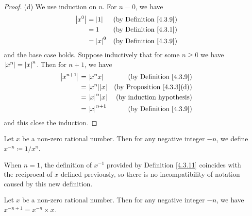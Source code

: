 \begin{proof}{(d)}
    We use induction on \(n\).
    For \(n = 0\), we have
    \begin{align*}
        \abs*{x^0} & = \abs*{1}   & \text{(by Definition \ref{4.3.9})} \\
                   & = 1          & \text{(by Definition \ref{4.3.1})} \\
                   & = \abs*{x}^0 & \text{(by Definition \ref{4.3.9})}
    \end{align*}
    and the base case holds.
    Suppose inductively that for some \(n \geq 0\) we have \(\abs*{x^n} = \abs*{x}^n\).
    Then for \(n + 1\), we have
    \begin{align*}
        \abs*{x^{n + 1}} & = \abs*{x^n x}        & \text{(by Definition \ref{4.3.9})}     \\
                         & = \abs*{x^n} \abs*{x} & \text{(by Proposition \ref{4.3.3}(d))} \\
                         & = \abs*{x}^n \abs*{x} & \text{(by induction hypothesis)}       \\
                         & = \abs*{x}^{n + 1}    & \text{(by Definition \ref{4.3.9})}
    \end{align*}
    and this close the induction.
\end{proof}

\begin{definition}\label{4.3.11}
    Let \(x\) be a non-zero rational number.
    Then for any negative integer \(-n\), we define \(x^{-n} \coloneqq 1 / x^n\).
\end{definition}

\begin{note}
    When \(n = 1\), the definition of \(x^{-1}\) provided by Definition \ref{4.3.11} coincides with the reciprocal of \(x\) defined previously, so there is no incompatibility of notation caused by this new definition.
\end{note}

\begin{additional corollary}\label{ac 4.3.2}
Let \(x\) be a non-zero rational number.
Then for any negative integer \(-n\), we have \(x^{-n + 1} = x^{-n} \times x\).
\end{additional corollary}

